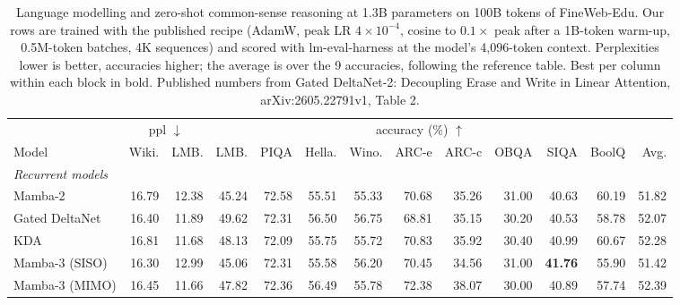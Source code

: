 \begin{table}[t]
  \centering
  \footnotesize
  \setlength{\tabcolsep}{3.5pt}
  \caption{Language modelling and zero-shot common-sense reasoning at 1.3B parameters on 100B tokens of FineWeb-Edu. Our rows are trained with the published recipe (AdamW, peak LR $4\times10^{-4}$, cosine to $0.1\times$ peak after a 1B-token warm-up, 0.5M-token batches, 4K sequences) and scored with lm-eval-harness at the model's 4{,}096-token context. Perplexities lower is better, accuracies higher; the average is over the 9 accuracies, following the reference table. Best per column within each block in bold. Published numbers from Gated DeltaNet-2: Decoupling Erase and Write in Linear Attention, arXiv:2605.22791v1, Table 2.}
  \label{tab:fwedu-1p3b-gdn2}
  \begin{tabular}{lrrrrrrrrrrrr}
    \toprule
    & \multicolumn{2}{c}{ppl $\downarrow$} & \multicolumn{9}{c}{accuracy (\%) $\uparrow$} & \\
    \cmidrule(lr){2-3} \cmidrule(lr){4-12} \cmidrule(lr){13-13}
    Model & Wiki. & LMB. & LMB. & PIQA & Hella. & Wino. & ARC-e & ARC-c & OBQA & SIQA & BoolQ & Avg. \\
    \midrule
    \multicolumn{13}{l}{\textit{Recurrent models}} \\
    Mamba-2 & 16.79 & 12.38 & 45.24 & 72.58 & 55.51 & 55.33 & 70.68 & 35.26 & 31.00 & 40.63 & 60.19 & 51.82 \\
    Gated DeltaNet & 16.40 & 11.89 & 49.62 & 72.31 & 56.50 & 56.75 & 68.81 & 35.15 & 30.20 & 40.53 & 58.78 & 52.07 \\
    KDA & 16.81 & 11.68 & 48.13 & 72.09 & 55.75 & 55.72 & 70.83 & 35.92 & 30.40 & 40.99 & 60.67 & 52.28 \\
    Mamba-3 (SISO) & 16.30 & 12.99 & 45.06 & 72.31 & 55.58 & 56.20 & 70.45 & 34.56 & 31.00 & \textbf{41.76} & 55.90 & 51.42 \\
    Mamba-3 (MIMO) & 16.45 & 11.66 & 47.82 & 72.36 & 56.49 & 55.78 & 72.38 & 38.07 & 30.00 & 40.89 & 57.74 & 52.39 \\

\end{tabular}
\end{table}
